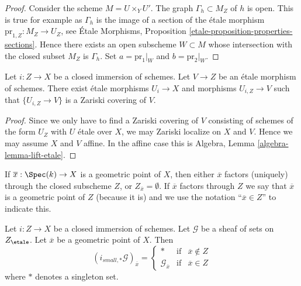 \begin{proof}
Consider the scheme $M = U \times_Y U'$. The graph $\Gamma_h \subset M_Z$
of $h$ is open. This is true for example as $\Gamma_h$ is the image of a
section of the \'etale morphism $\text{pr}_{1, Z} : M_Z \to U_Z$, see
\'Etale Morphisms, Proposition \ref{etale-proposition-properties-sections}.
Hence there exists an open subscheme $W \subset M$ whose intersection with
the closed subset $M_Z$ is $\Gamma_h$. Set $a = \text{pr}_1|_W$
and $b = \text{pr}_2|_W$.
\end{proof}

\begin{lemma}
\label{lemma-closed-immersion-almost-essentially-surjective}
Let $i : Z \to X$ be a closed immersion of schemes.
Let $V \to Z$ be an \'etale morphism of schemes.
There exist \'etale morphisms $U_i \to X$ and morphisms
$U_{i, Z} \to V$ such that $\{U_{i, Z} \to V\}$
is a Zariski covering of $V$.
\end{lemma}

\begin{proof}
Since we only have to find a Zariski covering of $V$ consisting of schemes
of the form $U_Z$ with $U$ \'etale over $X$, we may Zariski localize on $X$
and $V$. Hence we may assume $X$ and $V$ affine. In the affine case this is
Algebra, Lemma \ref{algebra-lemma-lift-etale}.
\end{proof}

\noindent
If $\overline{x} : \Spec(k) \to X$ is a geometric point of $X$, then
either $\overline{x}$ factors (uniquely) through the closed subscheme $Z$, or
$Z_{\overline{x}} = \emptyset$. If $\overline{x}$ factors through $Z$
we say that $\overline{x}$ is a geometric point of $Z$ (because it is) and
we use the notation ``$\overline{x} \in Z$'' to indicate this.

\begin{lemma}
\label{lemma-stalk-pushforward-closed-immersion}
Let $i : Z \to X$ be a closed immersion of schemes.
Let $\mathcal{G}$ be a sheaf of sets on $Z_\etale$.
Let $\overline{x}$ be a geometric point of $X$.
Then
$$
(i_{small, *}\mathcal{G})_{\overline{x}} =
\left\{
\begin{matrix}
* & \text{if} & \overline{x} \not \in Z \\
\mathcal{G}_{\overline{x}} & \text{if} & \overline{x} \in Z
\end{matrix}
\right.
$$
where $*$ denotes a singleton set.
\end{lemma}

